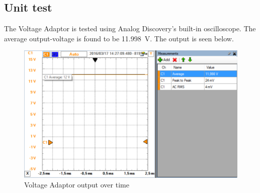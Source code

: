 \subsection{Unit test}
The Voltage Adaptor is tested using Analog Discovery's built-in oscilloscope. The average output-voltage is found to be \SI{11.998}{\volt}. The output is seen below.

\begin{figure}[H]
	\centering
	\includegraphics[width=0.9\linewidth]{Hardware/Pictures/VoltageAdaptor_test}
	\caption{Voltage Adaptor output over time}
	\label{fig:VoltageAdaptor_test}
\end{figure}